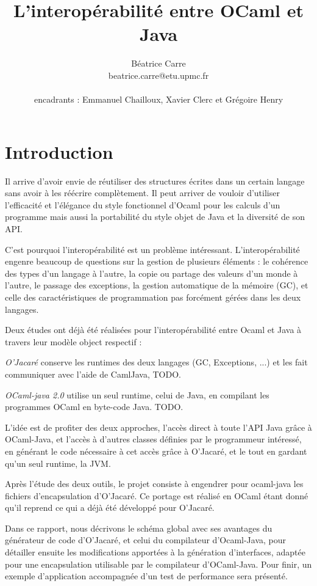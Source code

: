 \documentclass[a4paper, 11pt, notitlepage]{article}
\title{
  \huge L'interopérabilité entre OCaml et Java\\
}
\author{
  Béatrice Carre \\
  beatrice.carre@etu.upmc.fr \\
  \\
  encadrants : Emmanuel Chailloux, Xavier Clerc et Grégoire Henry \\
}
\begin{document}
\maketitle
\tableofcontents
\newpage
\section*{Introduction}
Il arrive d'avoir envie de réutiliser des structures
écrites dans un certain langage sans avoir à les réécrire complètement.
Il peut arriver de vouloir d'utiliser l'efficacité et
l'élégance du style fonctionnel d'Ocaml pour les calculs d'un
programme mais aussi la portabilité du style objet de Java et la
diversité de son API.

C'est pourquoi l'interopérabilité est un problème intéressant.
L'interopérabilité engenre beaucoup de questions sur la gestion de
plusieurs éléments :
le cohérence des types d'un langage à l'autre,
la copie ou partage des valeurs d'un monde à l'autre,
le passage des exceptions,
la gestion automatique de la mémoire (GC), 
et celle des caractéristiques de programmation pas forcément gérées dans les
deux langages.

Deux études ont déjà été réalisées pour l’interopérabilité entre
Ocaml et Java à travers leur modèle object respectif :

\emph{O’Jacaré} conserve les runtimes des deux langages (GC,
Exceptions, ...) et les fait communiquer avec l'aide de CamlJava, TODO.

\emph{OCaml-java
  2.0} utilise un seul runtime, celui de Java, en compilant les programmes OCaml en byte-code Java. TODO.
\newline

L'idée est de profiter des deux approches, l'accès direct à toute
l'API Java grâce à OCaml-Java, et l'accès à d'autres classes définies
par le programmeur intéressé, en générant le code nécessaire à cet
accès grâce à O'Jacaré, et le tout en gardant qu'un seul runtime, la JVM.

Après l’étude des deux outils, le projet consiste à engendrer pour
ocaml-java les fichiers d’encapsulation d'O’Jacaré. Ce
portage est réalisé en OCaml étant donné qu'il reprend ce qui
a déjà été développé pour O’Jacaré.
\newline

Dans ce rapport, nous décrivons le schéma global avec ses avantages du
générateur de code d'O'Jacaré, et celui du compilateur d'Ocaml-Java,
pour détailler ensuite les modifications apportées à la génération
d'interfaces, adaptée pour une encapsulation utilisable par le
compilateur d'OCaml-Java. 
Pour finir, un exemple d'application accompagnée d'un
test de performance sera présenté.
\end{document}
